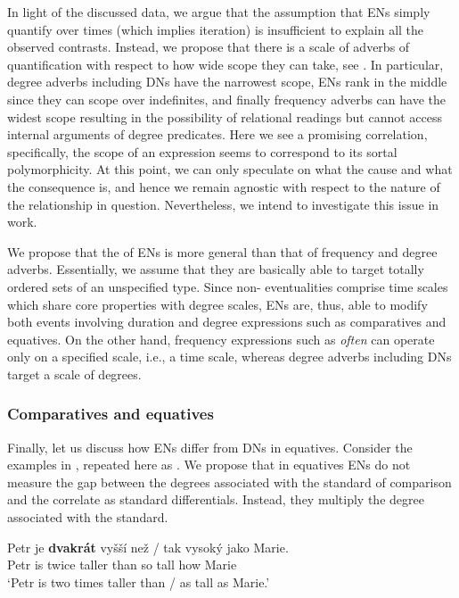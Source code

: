 \documentclass[output=paper,modfonts,hidelinks,newtxmath
\ChapterDOI{10.5281/zenodo.2545513}
]{langscibook}
\begin{document}
\noindent In light of the discussed data, we argue that the assumption that ENs simply quantify over times (which implies iteration) is insufficient to explain all the observed contrasts. Instead, we propose that there is a scale of adverbs of quantification with respect to how wide scope they can take, see . In particular, degree adverbs including DNs have the narrowest scope, ENs rank in the middle since they can scope over indefinites, and finally frequency adverbs can have the widest scope resulting in the possibility of relational readings but cannot access internal arguments of degree predicates. Here we see a promising correlation, specifically, the scope of an expression seems to correspond to its sortal polymorphicity. At this point, we can only speculate on what the cause and what the consequence is, and hence we remain agnostic with respect to the nature of the relationship in question. Nevertheless, we intend to investigate this issue in  work.


We propose that the  of ENs is more general than that of frequency and degree adverbs. Essentially, we assume that they are basically able to target totally ordered sets of an unspecified type. Since non- eventualities comprise time scales which share core properties with degree scales, ENs are, thus, able to modify both events involving duration and degree expressions such as comparatives and equatives. On the other hand, frequency expressions such as \textit{often} can operate only on a specified scale, i.e., a time scale, whereas degree adverbs including DNs target a scale of degrees.

\subsubsection{Comparatives and equatives}\label{comparatives-and-equatives}

Finally, let us discuss how ENs differ from DNs in equatives. Consider the examples in , repeated here as . We propose that in equatives ENs do not measure the gap between the degrees associated with the standard of comparison and the correlate as standard differentials. Instead, they multiply the degree associated with the standard.

\ea\label{comp-eq-dvakrat} \gll Petr je \textbf{dvakrát} vyšší než / tak vysoký jako Marie.\\
Petr is twice taller than {} so tall how Marie\\
\glt `Petr is two times taller than / as tall as Marie.'
\z
\end{document}
